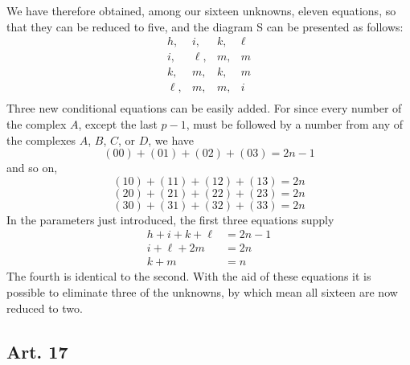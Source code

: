 \documentclass{book}
\theoremstyle{plain}
\theoremstyle{remark}
\begin{document}
We have therefore obtained, among our sixteen unknowns, eleven equations, so that they can be reduced to five, and the diagram S can be presented as follows:
\[ \begin{array}{llll}
h,&i,&k,&\ell\\
i,&\ell,&m,&m\\
k,&m,&k,&m\\
\ell,&m,&m,&i\\
\end{array} \]
Three new conditional equations can be easily added.  For since every number of the complex $A$, except the last $p-1$, must be followed by a number from any of the complexes $A$, $B$, $C$, or $D$, we have 
\[ (00) + (01) + (02) + (03) = 2n-1 \]
and so on,
\[ (10)+(11)+(12) + (13) = 2n \]
\[ (20)+(21)+(22) + (23) = 2n \]
\[ (30)+(31)+(32) + (33) = 2n \]
In the parameters just introduced, the first three equations supply
\begin{align*} h + i + k + \ell &= 2n-1 \\
 i + \ell + 2m &= 2n \\
  k+m &= n
\end{align*}
The fourth is identical to the second.  With the aid of these equations it is possible to eliminate three of the unknowns, by which mean all sixteen are now reduced to two.

\subsection*{Art. 17} 
\end{document}
